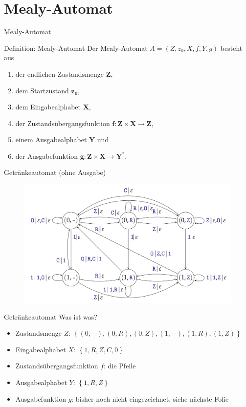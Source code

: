 \section{Mealy-Automat}
\begin{frame}{Mealy-Automat}
    \begin{block}{Definition: Mealy-Automat}
        Der Mealy-Automat $A = \left( Z, z_0, X, f, Y, g \right)$ besteht aus
        \begin{enumerate}
            \item der endlichen Zustandsmenge $\mathbf{Z}$,
            \item dem Startzustand $\mathbf{z_0}$,
            \item dem Eingabealphabet $\mathbf{X}$,
            \item der Zustandsübergangsfunktion $\mathbf{f: Z\times X \rightarrow Z}$,
            \item einem Ausgabealphabet $\mathbf{Y}$ und
            \item der Ausgabefunktion $\mathbf{g: Z\times X \rightarrow Y^*}$.
        \end{enumerate}
    \end{block}
\end{frame}
\begin{frame}{Getränkeautomat (ohne Ausgabe)}
    \begin{figure}[htbp]
        \centering
        \includegraphics[width=\textwidth,height=\textheight,keepaspectratio]{graphics/10/getraenke2.png}
    \end{figure}
\end{frame}
\begin{frame}{Getränkeautomat}
    Was ist was?
    \begin{itemize}
        \item Zustandsmenge $Z$: $\left\{ \left( 0,- \right), \left( 0,R \right), \left( 0,Z \right), \left( 1,- \right), \left( 1,R \right), \left( 1,Z \right) \right\}$
        \item Eingabealphabet $X$: $\left\{ 1, R, Z, C, 0 \right\}$
        \item Zustandsübergangsfunktion $f$: die Pfeile
        \item Ausgabealphabet $Y$: $\left\{ 1, R, Z \right\}$
        \item Ausgabefunktion $g$: bisher noch nicht eingezeichnet, siehe nächste Folie
    \end{itemize}
\end{frame}
